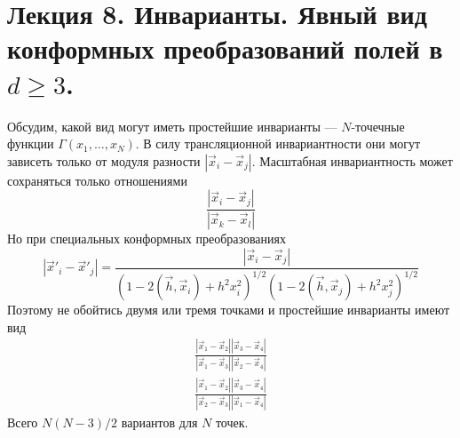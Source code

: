 \documentclass[a4paper,12pt]{article}
\theoremstyle{definition}
\theoremstyle{definition}
\theoremstyle{definition}
\begin{document}
\section{Лекция 8. Инварианты. Явный вид конформных преобразований полей в $d\geq 3$.}
\label{sec:lecture-8}
Обсудим, какой вид могут иметь простейшие инварианты --- $N$-точечные функции $\Gamma(x_1,\dots,x_N)$. В силу трансляционной инвариантности они могут зависеть только от модуля разности $|\vec x_i-\vec x_j|$.  Масштабная инвариантность может сохраняться только отношениями
\begin{equation}
  \label{eq:173}
  \frac{|\vec x_i-\vec x_j|}{|\vec x_k -\vec x_l|}
\end{equation}
Но при специальных конформных преобразованиях
\begin{equation}
  \label{eq:174}
  |\vec x'_i-\vec x'_j|=\frac{|\vec x_i-\vec x_j|}{(1-2(\vec h,\vec x_i)+h^2x_i^2)^{1/2} (1-2(\vec h,\vec x_j)+h^2 x_j^2)^{1/2}}
\end{equation}
Поэтому не обойтись двумя или тремя точками и простейшие инварианты имеют вид
\begin{eqnarray}
  \label{eq:175}
  \frac{|\vec x_1-\vec x_2||\vec x_3-\vec x_4|}{|\vec x_1-\vec x_3||\vec x_{2}-\vec x_{4}|}\\
  \frac{|\vec x_1-\vec x_2||\vec x_3-\vec x_4|}{|\vec x_2-\vec x_3||\vec x_{1}-\vec x_{4}|}
\end{eqnarray}
Всего $N(N-3)/2$ вариантов для $N$ точек.
\end{document}
